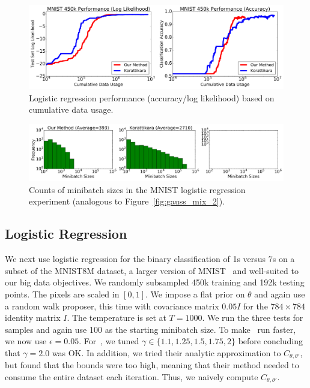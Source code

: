 \documentclass[twoside]{article} \usepackage{aistats2017}
\begin{document}
\begin{figure}[t]
	\centering
	\includegraphics[width=0.85\linewidth]{logistic_regression_ll_acc_results.png}
	\caption{
    Logistic regression performance (accuracy/log likelihood) based on
    cumulative data usage.
    }
	\label{fig:logistic_performance}
\end{figure}
\begin{figure}[t]
	\centering
	\includegraphics[width=0.85\linewidth]{logistic_regression_histograms_results.png}
	\caption{
    Counts of minibatch sizes in the MNIST logistic regression experiment
    (analogous to Figure~\ref{fig:gauss_mix_2}).
    }
	\label{fig:logistic_minibatch}
\end{figure}

\subsection{Logistic Regression}\label{ssec:logistic}

We next use logistic regression for the binary classification of 1s versus 7s on
a subset of the MNIST8M dataset, a larger version of
MNIST~\citep{lecun-mnisthandwrittendigit-2010} and well-suited to our big data
objectives. We randomly subsampled 450k training and 192k testing points. The
pixels are scaled in $[0,1]$. We impose a flat prior on $\theta$ and again use a
random walk proposer, this time with covariance matrix $0.05I$ for the
$784\times 784$ identity matrix $I$. The temperature is set at $T=1000$. We run
the three tests for samples and again use 100 as the starting minibatch size. To
make~\citet{cutting_mh_2014} run faster, we now use $\epsilon=0.05$.
For~\citet{icml2014c1_bardenet14}, we tuned $\gamma \in \{1.1,1.25,1.5,1.75,2\}$
before concluding that $\gamma=2.0$ was OK. In addition, we tried their analytic
approximation to $C_{\theta,\theta'}$, but found that the bounds were too high,
meaning that their method needed to consume the entire dataset each iteration.
Thus, we naively compute $C_{\theta,\theta'}$.
\end{document}
